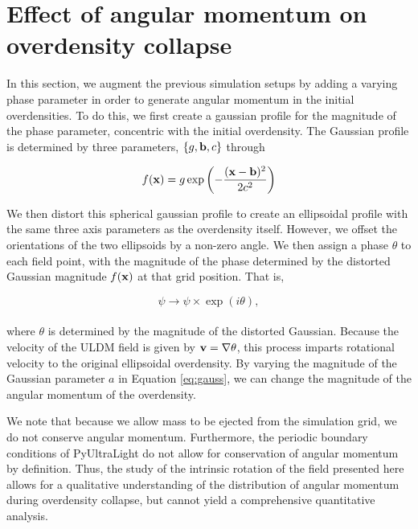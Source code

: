 \documentclass[a4paper,11pt]{article}
\begin{document}
\section{Effect of angular momentum on overdensity collapse}\label{sec:rotation}

In this section, we augment the previous simulation setups by adding a varying phase parameter in order to generate angular momentum in the initial overdensities. To do this, we first create a gaussian profile for the magnitude of the phase parameter, concentric with the initial overdensity. The Gaussian profile is determined by three parameters, $\{g, \bold{b}, c\}$ through

\begin{equation}\label{eq:gauss}
    f(\bold{x}) = g\exp\left(-\frac{(\bold{x}-\bold{b})^2}{2c^2}\right)    
\end{equation}

We then distort this spherical gaussian profile to create an ellipsoidal profile with the same three axis parameters as the overdensity itself. However, we offset the orientations of the two ellipsoids by a non-zero angle. We then assign a phase $\theta$ to each field point, with the magnitude of the phase determined by the distorted Gaussian magnitude $f(\bold{x})$ at that grid position. That is,  

\begin{equation}
    \psi \rightarrow \psi \times \exp(i\theta),
\end{equation}
\\
where $\theta$ is determined by the magnitude of the distorted Gaussian. Because the velocity of the ULDM field is given by $\bold{v} = \bold{\nabla} \theta$, this process imparts rotational velocity to the original ellipsoidal overdensity. By varying the magnitude of the Gaussian parameter $a$ in Equation \ref{eq:gauss}, we can change the magnitude of the angular momentum of the overdensity.

We note that because we allow mass to be ejected from the simulation grid, we do not conserve angular momentum. Furthermore, the periodic boundary conditions of {\sc PyUltraLight} do not allow for conservation of angular momentum by definition. Thus, the study of the intrinsic rotation of the field presented here allows for a qualitative understanding of the distribution of angular momentum during overdensity collapse, but cannot yield a comprehensive quantitative analysis. 
\end{document}
